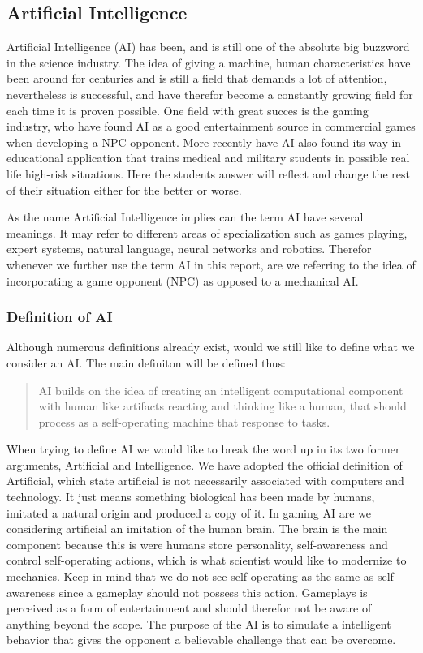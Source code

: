 


\subsection{Artificial Intelligence} \label{sec:ai}
Artificial Intelligence (AI) has been, and is still one of the absolute big buzzword in the science industry.
The idea of giving a machine, human characteristics have been around for centuries and is still a field that demands a lot of attention, nevertheless is successful, and have therefor become a constantly growing field for each time it is proven possible.
One field with great succes is the gaming industry, who have found AI as a good entertainment source in commercial games when developing a NPC opponent. More recently have AI also found its way in educational application that trains medical and military students in possible real life high-risk situations. Here the students answer will reflect and change the rest of their situation either for the better or worse.

As the name Artificial Intelligence implies can the term AI have several meanings. It may refer to different areas of specialization such as games playing, expert systems, natural language, neural networks and robotics.
Therefor whenever we further use the term AI in this report, are we referring to the idea of incorporating a game opponent (NPC) as opposed to a mechanical AI.



\subsubsection{Definition of AI}

Although numerous definitions already exist, would we still like to define what we consider an AI. The main definiton will be defined thus:

		\begin{quote}
		AI builds on the idea of creating an intelligent computational component with human like artifacts 			reacting and thinking like a human, that should process as a self-operating machine that response to 		tasks.
		\end{quote}

When trying to define AI we would like to break the word up in its two former arguments, Artificial and Intelligence.
We have adopted the official definition of Artificial, which state artificial is not necessarily associated with computers and technology. It just means something biological has been made by humans, imitated a natural origin and produced a copy of it.
In gaming AI are we considering artificial an imitation of the human brain. The brain is the main component because this is were humans store personality, self-awareness and control self-operating actions, which is what scientist would like to modernize to mechanics.
Keep in mind that we do not see self-operating as the same as self-awareness since a gameplay should not possess this action. Gameplays is perceived as a form of entertainment and should therefor not be aware of anything beyond the scope. The purpose of the AI is to simulate a intelligent behavior that gives the opponent a believable challenge that can be overcome.

